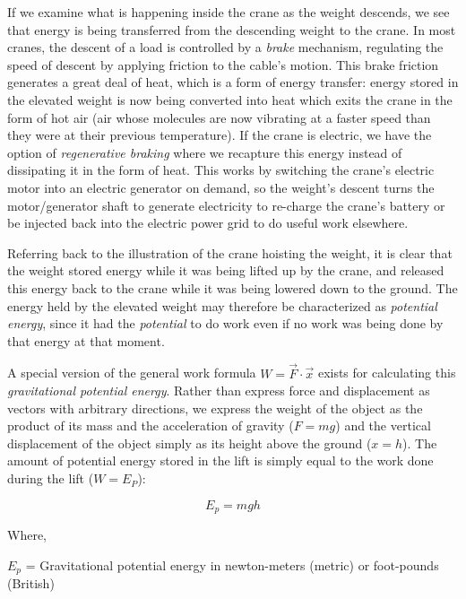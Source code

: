 If we examine what is happening inside the crane as the weight descends, we see that energy is being transferred from the descending weight to the crane.  In most cranes, the descent of a load is controlled by a \textit{brake} mechanism, regulating the speed of descent by applying friction to the cable's motion.  This brake friction generates a great deal of heat, which is a form of energy transfer: energy stored in the elevated weight is now being converted into heat which exits the crane in the form of hot air (air whose molecules are now vibrating at a faster speed than they were at their previous temperature).  If the crane is electric, we have the option of \textit{regenerative braking} where we recapture this energy instead of dissipating it in the form of heat.  This works by switching the crane's electric motor into an electric generator on demand, so the weight's descent turns the motor/generator shaft to generate electricity to re-charge the crane's battery or be injected back into the electric power grid to do useful work elsewhere.

\vskip 10pt

\filbreak

Referring back to the illustration of the crane hoisting the weight, it is clear that the weight stored energy while it was being lifted up by the crane, and released this energy back to the crane while it was being lowered down to the ground.  The energy held by the elevated weight may therefore be characterized as \textit{potential energy}, since it had the \textit{potential} to do work even if no work was being done by that energy at that moment.    

A special version of the general work formula $W = \vec{F} \cdot \vec{x}$ exists for calculating this \textit{gravitational potential energy}.  Rather than express force and displacement as vectors with arbitrary directions, we express the weight of the object as the product of its mass and the acceleration of gravity ($F = mg$) and the vertical displacement of the object simply as its height above the ground ($x = h$).  The amount of potential energy stored in the lift is simply equal to the work done during the lift ($W = E_P$):  

$$E_p = mgh$$

\noindent
Where,

$E_p$ = Gravitational potential energy in newton-meters (metric) or foot-pounds (British)

